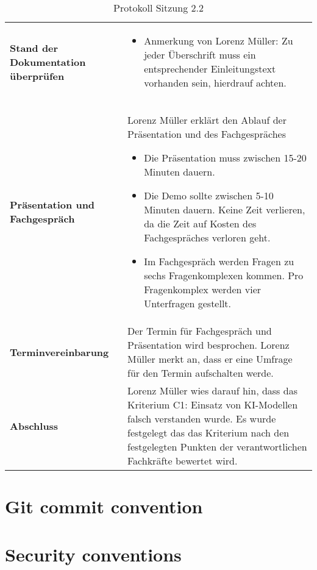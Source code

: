 \newpage

\begin{table}[H]
    \begin{tabular}{|L{0.3\textwidth}|L{0.7\textwidth}|}
        \hline
        \textbf{Stand der Dokumentation überprüfen} & 
        \begin{itemize}
            \item Anmerkung von Lorenz Müller: Zu jeder Überschrift muss ein entsprechender Einleitungstext vorhanden sein, hierdrauf achten.
        \end{itemize} \\
        \textbf{Präsentation und Fachgespräch} & Lorenz Müller erklärt den Ablauf der Präsentation und des Fachgespräches
        \begin{itemize}
            \item Die Präsentation muss zwischen 15-20 Minuten dauern.
            \item Die Demo sollte zwischen 5-10 Minuten dauern. Keine Zeit verlieren, da die Zeit auf Kosten des Fachgespräches verloren geht.
            \item Im Fachgespräch werden Fragen zu sechs Fragenkomplexen kommen. Pro Fragenkomplex werden vier Unterfragen gestellt.
        \end{itemize}
        \\
        \hline
        \textbf{Terminvereinbarung} & Der Termin für Fachgespräch und Präsentation wird besprochen. Lorenz Müller merkt an, dass er eine Umfrage für den Termin aufschalten werde. \\
        \hline
        \textbf{Abschluss} & Lorenz Müller wies darauf hin, dass das Kriterium C1: Einsatz von KI-Modellen falsch verstanden wurde. Es wurde festgelegt das 
        das Kriterium nach den festgelegten Punkten der verantwortlichen Fachkräfte bewertet wird.   \\
        \hline
    \end{tabular}
    \caption{Protokoll Sitzung 2.2}
\end{table}

\section{Git commit convention}
\section{Security conventions}





